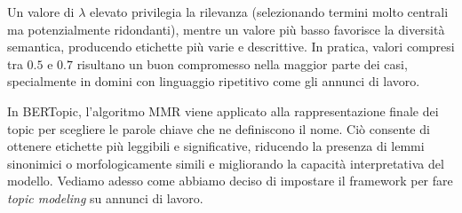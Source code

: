 Un valore di $\lambda$ elevato privilegia la rilevanza (selezionando termini molto centrali ma potenzialmente ridondanti), mentre un valore più basso favorisce la diversità semantica, producendo etichette più varie e descrittive. In pratica, valori compresi tra $0.5$ e $0.7$ risultano un buon compromesso nella maggior parte dei casi, specialmente in domini con linguaggio ripetitivo come gli annunci di lavoro.

In BERTopic, l’algoritmo MMR viene applicato alla rappresentazione finale dei topic per scegliere le parole chiave che ne definiscono il nome. Ciò consente di ottenere etichette più leggibili e significative, riducendo la presenza di lemmi sinonimici o morfologicamente simili e migliorando la capacità interpretativa del modello.
\noindent Vediamo adesso come abbiamo deciso di impostare il framework per fare \textit{topic modeling} su annunci di lavoro.